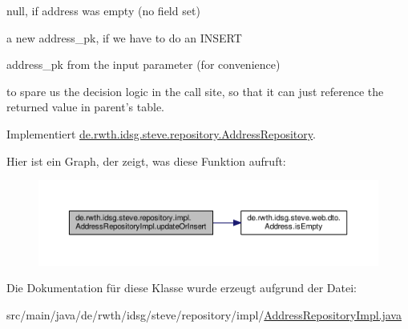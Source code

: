 \begin{DoxyItemize}
\item null, if address was empty (no field set)
\item a new address\-\_\-pk, if we have to do an I\-N\-S\-E\-R\-T
\item address\-\_\-pk from the input parameter (for convenience)
\end{DoxyItemize}

to spare us the decision logic in the call site, so that it can just reference the returned value in parent's table. 

Implementiert \hyperlink{interfacede_1_1rwth_1_1idsg_1_1steve_1_1repository_1_1_address_repository_a35873a3790f0f03326015bb90a64a5f8}{de.\-rwth.\-idsg.\-steve.\-repository.\-Address\-Repository}.



Hier ist ein Graph, der zeigt, was diese Funktion aufruft\-:\nopagebreak
\begin{figure}[H]
\begin{center}
\leavevmode
\includegraphics[width=350pt]{classde_1_1rwth_1_1idsg_1_1steve_1_1repository_1_1impl_1_1_address_repository_impl_a4e69d0f515bee3064f3b846fb046aa80_cgraph}
\end{center}
\end{figure}




Die Dokumentation für diese Klasse wurde erzeugt aufgrund der Datei\-:\begin{DoxyCompactItemize}
\item 
src/main/java/de/rwth/idsg/steve/repository/impl/\hyperlink{_address_repository_impl_8java}{Address\-Repository\-Impl.\-java}\end{DoxyCompactItemize}
